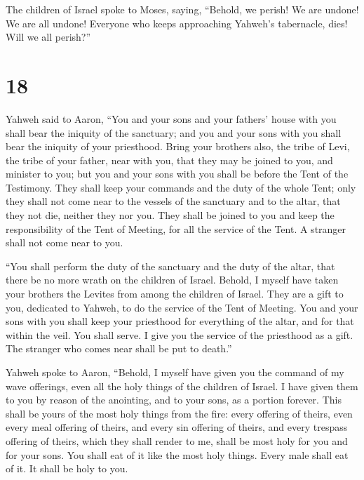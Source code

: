  The children of Israel spoke to Moses, saying, ``Behold,
we perish! We are undone! We are all undone!  Everyone
who keeps approaching Yahweh's tabernacle, dies! Will we all perish?''

\hypertarget{section-17}{%
\section{18}\label{section-17}}

 Yahweh said to Aaron, ``You and your sons and your
fathers' house with you shall bear the iniquity of the sanctuary; and
you and your sons with you shall bear the iniquity of your priesthood.
 Bring your brothers also, the tribe of Levi, the tribe of
your father, near with you, that they may be joined to you, and minister
to you; but you and your sons with you shall be before the Tent of the
Testimony.  They shall keep your commands and the duty of
the whole Tent; only they shall not come near to the vessels of the
sanctuary and to the altar, that they not die, neither they nor you.
 They shall be joined to you and keep the responsibility
of the Tent of Meeting, for all the service of the Tent. A stranger
shall not come near to you.

 ``You shall perform the duty of the sanctuary and the
duty of the altar, that there be no more wrath on the children of
Israel.  Behold, I myself have taken your brothers the
Levites from among the children of Israel. They are a gift to you,
dedicated to Yahweh, to do the service of the Tent of Meeting.
 You and your sons with you shall keep your priesthood for
everything of the altar, and for that within the veil. You shall serve.
I give you the service of the priesthood as a gift. The stranger who
comes near shall be put to death.''

 Yahweh spoke to Aaron, ``Behold, I myself have given you
the command of my wave offerings, even all the holy things of the
children of Israel. I have given them to you by reason of the anointing,
and to your sons, as a portion forever.  This shall be
yours of the most holy things from the fire: every offering of theirs,
even every meal offering of theirs, and every sin offering of theirs,
and every trespass offering of theirs, which they shall render to me,
shall be most holy for you and for your sons.  You shall
eat of it like the most holy things. Every male shall eat of it. It
shall be holy to you.

